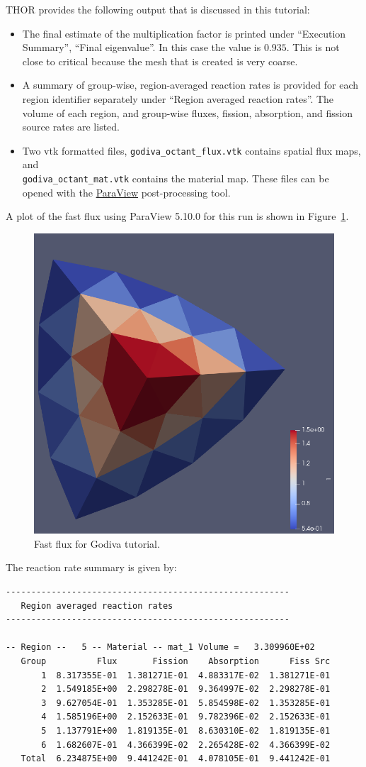 \ac{THOR} provides the following output that is discussed in this tutorial:
\begin{itemize}
    \item The final estimate of the multiplication factor is printed under ``Execution Summary'', ``Final eigenvalue''.
    In this case the value is $0.935$. This is not close to critical because the mesh that
    is created is very coarse.
    \item A summary of group-wise, region-averaged reaction rates is provided for each region identifier separately under ``Region averaged reaction rates''.
    The volume of each region, and group-wise fluxes, fission, absorption, and fission source rates are listed.
    \item Two vtk formatted files, \verb"godiva_octant_flux.vtk" contains spatial flux maps, and \\
    \verb"godiva_octant_mat.vtk" contains the material map. These files can be opened with the \href{https://www.paraview.org/download/}{ParaView} post-processing tool.
\end{itemize}

A plot of the fast flux using ParaView 5.10.0 for this run is shown in Figure~\ref{fig:godiva_fast}.
\begin{figure}[th]
  \center
  \includegraphics[height=0.5\textwidth]{chapters/tutorials/figures/godiva_fast.png}
  \caption{Fast flux for Godiva tutorial.}
  \label{fig:godiva_fast}
\end{figure}

The reaction rate summary is given by:
\begin{verbatim}
--------------------------------------------------------
   Region averaged reaction rates
--------------------------------------------------------

-- Region --   5 -- Material -- mat_1 Volume =   3.309960E+02
   Group          Flux       Fission    Absorption      Fiss Src
       1  8.317355E-01  1.381271E-01  4.883317E-02  1.381271E-01
       2  1.549185E+00  2.298278E-01  9.364997E-02  2.298278E-01
       3  9.627054E-01  1.353285E-01  5.854598E-02  1.353285E-01
       4  1.585196E+00  2.152633E-01  9.782396E-02  2.152633E-01
       5  1.137791E+00  1.819135E-01  8.630310E-02  1.819135E-01
       6  1.682607E-01  4.366399E-02  2.265428E-02  4.366399E-02
   Total  6.234875E+00  9.441242E-01  4.078105E-01  9.441242E-01
\end{verbatim}

